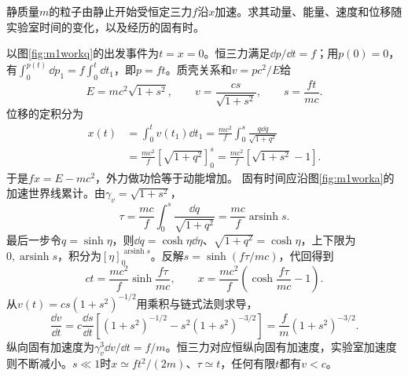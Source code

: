 \begin{exercise}\label{ex:m1fourwork}
静质量$m$的粒子由静止开始受恒定三力$f$沿$x$加速。求其动量、能量、速度和位移随实验室时间的变化，以及经历的固有时。
\end{exercise}
\begin{solution}
以图\ref{fig:m1workq}的出发事件为$t=x=0$。恒三力满足$\dd p/\dd t=f$；用$p(0)=0$，有$\int_0^{p(t)}\dd p_1=f\int_0^t\dd t_1$，即$p=ft$。质壳关系和$v=pc^2/E$给
\[
 E=mc^2\sqrt{1+s^2},\qquad
 v=\frac{cs}{\sqrt{1+s^2}},\qquad s=\frac{ft}{mc}.
\]
位移的定积分为
\begin{align*}
 x(t)&=\int_0^t v(t_1)\dd t_1
 =\frac{mc^2}f\int_0^s\frac{q\dd q}{\sqrt{1+q^2}}\\
 &=\frac{mc^2}f[\sqrt{1+q^2}]_0^s
 =\frac{mc^2}f[\sqrt{1+s^2}-1].
\end{align*}
于是$fx=E-mc^2$，外力做功恰等于动能增加。
固有时间应沿图\ref{fig:m1worka}的加速世界线累计。由$\gamma_v=\sqrt{1+s^2}$，
\[
 \tau=\frac{mc}f\int_0^s\frac{\dd q}{\sqrt{1+q^2}}
 =\frac{mc}f\operatorname{arsinh}s.
\]
最后一步令$q=\sinh\eta$，则$\dd q=\cosh\eta\dd\eta$、$\sqrt{1+q^2}=\cosh\eta$，上下限为$0,\operatorname{arsinh}s$，积分为$[\eta]_0^{\operatorname{arsinh}s}$。反解$s=\sinh(f\tau/mc)$，代回得到
\[
 ct=\frac{mc^2}f\sinh\frac{f\tau}{mc},\qquad
 x=\frac{mc^2}f\left(\cosh\frac{f\tau}{mc}-1\right).
\]
从$v(t)=cs(1+s^2)^{-1/2}$用乘积与链式法则求导，
\[
 \frac{\dd v}{\dd t}=c\frac{\dd s}{\dd t}
 \left[(1+s^2)^{-1/2}-s^2(1+s^2)^{-3/2}\right]
 =\frac fm(1+s^2)^{-3/2}.
\]
纵向固有加速度为$\gamma_v^3\dd v/\dd t=f/m$。恒三力对应恒纵向固有加速度，实验室加速度则不断减小。$s\ll1$时$x\simeq ft^2/(2m)$、$\tau\simeq t$，任何有限$t$都有$v<c$。
\end{solution}

